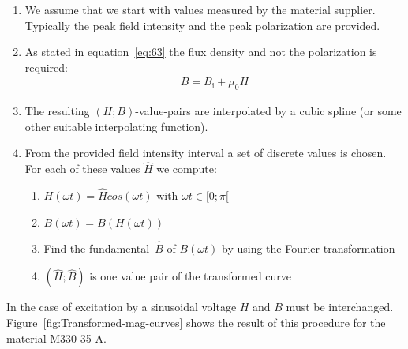 \begin{enumerate}
\item We assume that we start with values measured by the material
  supplier.  Typically the peak field intensity and the peak
  polarization are provided.
\item As stated in equation~\eqref{eq:63} the flux density and not the
  polarization is required:
  \begin{gather}
    \label{eq:64}
    B = B_{\mathrm{i}}+\mu_0 H
  \end{gather}
\item The resulting $(H;B)$-value-pairs are interpolated by a
  cubic spline (or some other suitable interpolating function).
\item From the provided field intensity interval a set of discrete
  values is chosen.  For each of these values $\hat{H}$ we compute:
  \begin{enumerate}
  \item $H(\omega t)=\hat{H}cos(\omega t)$ with $\omega
    t\in[0;\pi[$
  \item $B(\omega t)=B(H(\omega t))$
  \item Find the fundamental~$\hat{B}$ of $B(\omega t)$ by
    using the Fourier transformation
  \item $(\hat{H};\hat{B})$ is one value pair of the
    transformed curve
  \end{enumerate}
\end{enumerate}
In the case of excitation by a sinusoidal voltage $H$ and $B$
must be interchanged.  Figure~\ref{fig:Transformed-mag-curves} shows
the result of this procedure for the material M330-35-A.
